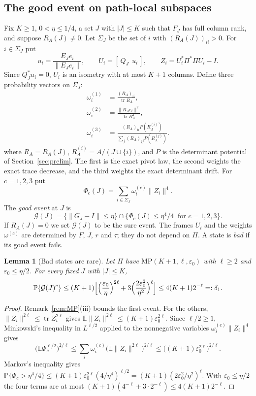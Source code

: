 \documentclass[11pt]{article}
\newtheorem{lemma}[theorem]{Lemma}
\theoremstyle{definition}\newtheorem{definition}[theorem]{Definition}
\theoremstyle{remark}\newtheorem{remark}[theorem]{Remark}
\newcommand{\E}{\mathbb E}
\newcommand{\Prob}{\mathbb P}
\newcommand{\eps}{\varepsilon}
\newcommand{\tr}{\operatorname{tr}}
\newcommand{\calG}{\mathcal G}
\newcommand{\1}{\mathbf 1}
\newcommand{\MP}{\mathrm{MP}}
\begin{document}
\subsection{The good event on path-local subspaces}
Fix $K\ge1$, $0<\eta\le1/4$, a set $J$ with $|J|\le K$ such that $F_J$
has full column rank, and suppose $R_A(J)\ne0$. Let $\Sigma_J$ be the set
of $i$ with $(R_A(J))_{ii}>0$. For $i\in\Sigma_J$ put
\[
 u_i=\frac{E_Je_i}{\|E_Je_i\|},\qquad U_i=[\,Q_J\ \ u_i\,],\qquad
 Z_i=U_i^*\Pi^*\Pi U_i-I .
\]
Since $Q_J^*u_i=0$, $U_i$ is an isometry with at most $K+1$ columns.
Define three probability vectors on $\Sigma_J$:
\begin{align*}
 \omega^{(1)}_i&=\frac{(R_A)_{ii}}{\tr R_A},\\
 \omega^{(2)}_i&=\frac{\|R_Ae_i\|^2}{\tr R_A^2},\\
 \omega^{(3)}_i&=\frac{(R_A)_{ii}P(R_A^{(i)})}{\sum_j(R_A)_{jj}P(R_A^{(j)})}.
\end{align*}
where $R_A=R_A(J)$, $R_A^{(i)}=A/(J\cup\{i\})$, and $P$ is the
determinant potential of Section~\ref{sec:prelim}. The first is the exact
pivot law, the second weights the exact trace decrease, and the third
weights the exact determinant drift. For $c=1,2,3$ put
\[
 \Phi_c(J)=\sum_{i\in\Sigma_J}\omega^{(c)}_i\|Z_i\|^4 .
\]
The \emph{good event} at $J$ is
\begin{equation}\label{eq:good}
 \calG(J)=\bigl\{\|G_J-I\|\le\eta\bigr\}\cap
 \bigl\{\Phi_c(J)\le\eta^4/4\ \text{ for }c=1,2,3\bigr\}.
\end{equation}
If $R_A(J)=0$ we set $\calG(J)$ to be the sure event. The frames $U_i$
and the weights $\omega^{(c)}$ are determined by $F$, $J$, $r$ and
$\tau$; they do not depend on $\Pi$. A state is \emph{bad} if its good
event fails.

\begin{lemma}[Bad states are rare]\label{lem:bad}
Let $\Pi$ have $\MP(K+1,\ell,\eps_0)$ with $\ell\ge2$ and
$\eps_0\le\eta/2$. For every fixed $J$ with $|J|\le K$,
\[
 \Prob\{\calG(J)^c\}\le(K+1)\Bigl[\Bigl(\frac{\eps_0}\eta\Bigr)^{2\ell}
 +3\Bigl(\frac{2\eps_0^2}{\eta^2}\Bigr)^\ell\Bigr]
 \le4(K+1)2^{-\ell}=:\delta_1 .
\]
\end{lemma}
\begin{proof}
Remark~\ref{rem:MP}(iii) bounds the first event. For the others,
$\|Z_i\|^{2\ell}\le\tr Z_i^{2\ell}$ gives
$\E\|Z_i\|^{2\ell}\le(K+1)\eps_0^{2\ell}$. Since $\ell/2\ge1$,
Minkowski's inequality in $L^{\ell/2}$ applied to the nonnegative
variables $\omega_i^{(c)}\|Z_i\|^4$ gives
\[
 \bigl(\E\Phi_c^{\ell/2}\bigr)^{2/\ell}
 \le\sum_i\omega^{(c)}_i\bigl(\E\|Z_i\|^{2\ell}\bigr)^{2/\ell}
 \le\bigl((K+1)\eps_0^{2\ell}\bigr)^{2/\ell}.
\]
Markov's inequality gives
$\Prob\{\Phi_c>\eta^4/4\}\le(K+1)\eps_0^{2\ell}(4/\eta^4)^{\ell/2}
=(K+1)(2\eps_0^2/\eta^2)^\ell$. With $\eps_0\le\eta/2$ the four terms
are at most $(K+1)(4^{-\ell}+3\cdot2^{-\ell})\le4(K+1)2^{-\ell}$.
\end{proof}
\end{document}
